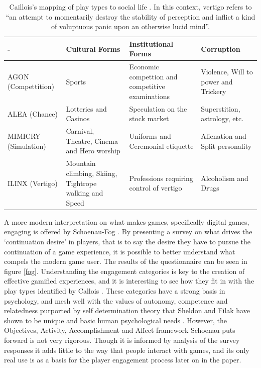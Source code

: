 \documentclass[12pt]{article}
\begin{document}
\begin{table}[p]
	\begin{tabular}{|p{2.0cm}|p{4.2cm}|p{4.2cm}|p{4.2cm}|}
		\hline - & Cultural Forms & Institutional Forms & Corruption \\ 
		\hline AGON (Compettition) & Sports & Economic compettion and competitive examinations & Violence, Will to power and Trickery \\ 
		\hline ALEA (Chance) & Lotteries and Casinos & Speculation on the stock market & Superstition, astrology, etc. \\ 
		\hline MIMICRY (Simulation) & Carnival, Theatre, Cinema and Hero worship & Uniforms and Ceremonial etiquette & Alienation and Split personality \\ 
		\hline ILINX (Vertigo) & Mountain climbing, Skiing, Tightrope walking and Speed & Professions requiring control of vertigo & Alcoholism and Drugs \\ 
		\hline 
	\end{tabular}
	\caption{Caillois's mapping of play types to social life \cite{caillois1961man}. In this context, vertigo refers to ``an attempt to momentarily destroy the stability of perception and inflict a kind of voluptuous panic upon an otherwise lucid mind''.}
	\label{table:corruption}
\end{table}

A more modern interpretation on what makes games, specifically digital games, engaging is offered by Schoenau-Fog \cite{schoenau2011player}. By presenting a survey on what drives the `continuation desire' in players, that is to say the desire they have to pursue the continuation of a game experience, it is possible to better understand what compels the modern game user. The results of the questionnaire can be seen in figure \ref{fog}. Understanding the engagement categories is key to the creation of effective gamified experiences, and it is interesting to see how they fit in with the play types identified by Callois \cite{caillois1961man}. These categories have a strong basis in psychology, and mesh well with the values of autonomy, competence and relatedness purported by self determination theory that Sheldon and Filak have shown to be unique and basic human psychological needs \cite{sheldon2008manipulating}. However, the Objectives, Activity, Accomplishment and Affect framework Schoenau puts forward is not very rigorous. Though it is informed by analysis of the survey responses it adds little to the way that people interact with games, and its only real use is as a basis for the player engagement process later on in the paper.
\end{document}
